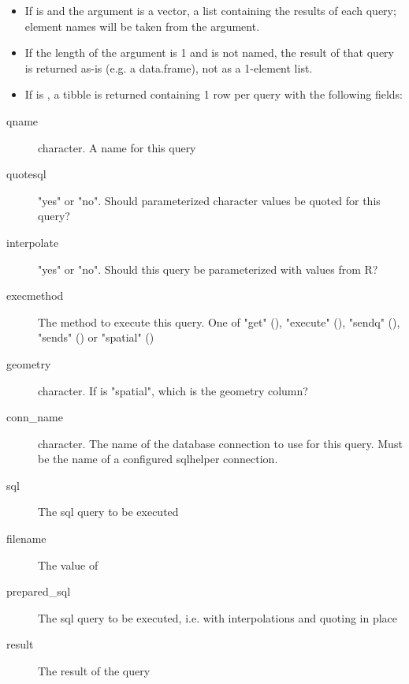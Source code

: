 \documentclass[a4paper]{book}
\begin{document}
\begin{Value}
\begin{itemize}

\item{} If  is  and the  argument is a
vector, a list containing the results of each query; element names will be
taken from the  argument.
\item{} If the length of the  argument is 1 and is not named, the result of
that query is returned as-is (e.g. a data.frame), not as a 1-element list.
\item{} If  is , a tibble is returned containing 1
row per query with the following fields:

\end{itemize}


\begin{description}

\item[qname] character. A name for this query
\item[quotesql] "yes" or "no". Should parameterized character values be quoted for this query?
\item[interpolate] "yes" or "no". Should this query be parameterized with values from R?
\item[execmethod] The method to execute this query.
One of "get" (), "execute" (), "sendq" (), "sends" () or "spatial" ()
\item[geometry] character. If  is "spatial", which is the geometry column?
\item[conn\_name] character. The name of the database connection to use for this query.
Must be the name of a configured sqlhelper connection.
\item[sql] The sql query to be executed
\item[filename] The value of 
\item[prepared\_sql] The sql query to be executed, i.e. with interpolations
and quoting in place
\item[result] The result of the query

\end{description}

\end{Value}
\end{document}
